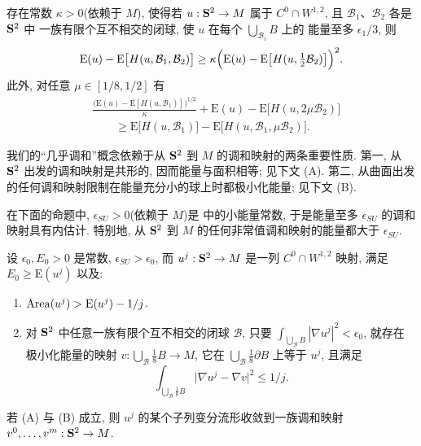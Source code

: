 \begin{lemma}
\label{lem:5.11}
存在常数 $\kappa>0$(依赖于 $M$), 使得若 $u:\mathbf{S}^2\to M$ 属于
$C^0\cap W^{1,2}$, 且 $\mathcal{B}_1$、$\mathcal{B}_2$ 各是 $\mathbf{S}^2$ 中
一族有限个互不相交的闭球, 使 $u$ 在每个 $\bigcup_{\mathcal{B}_i}B$ 上的
能量至多 $\epsilon_1/3$, 则
\begin{equation}
\mathrm{E}(u)-\mathrm{E}\bigl[H(u,\mathcal{B}_1,\mathcal{B}_2)\bigr]
\geq\kappa\Bigl(\mathrm{E}(u)-\mathrm{E}\bigl[H(u,\tfrac12\mathcal{B}_2)\bigr]
\Bigr)^2.
\label{eq:5.37}
\end{equation}
此外, 对任意 $\mu\in[1/8,1/2]$ 有
\begin{equation}
\begin{aligned}
&\frac{\bigl(\mathrm{E}(u)-\mathrm{E}[H(u,\mathcal{B}_1)]\bigr)^{1/2}}{\kappa}
+\mathrm{E}(u)-\mathrm{E}\bigl[H(u,2\mu\mathcal{B}_2)\bigr]\\
&\qquad\geq\mathrm{E}\bigl[H(u,\mathcal{B}_1)\bigr]
-\mathrm{E}\bigl[H(u,\mathcal{B}_1,\mu\mathcal{B}_2)\bigr].
\end{aligned}
\label{eq:5.38}
\end{equation}
\end{lemma}

我们的``几乎调和''概念依赖于从 $\mathbf{S}^2$ 到 $M$ 的调和映射的两条重要性质.
第一, 从 $\mathbf{S}^2$ 出发的调和映射是共形的, 因而能量与面积相等; 见下文 (A).
第二, 从曲面出发的任何调和映射限制在能量充分小的球上时都极小化能量;
见下文 (B).

在下面的命题中, $\epsilon_{SU}>0$(依赖于 $M$)是 中的小能量常数,
于是能量至多 $\epsilon_{SU}$ 的调和映射具有内估计. 特别地, 从 $\mathbf{S}^2$ 到
$M$ 的任何非常值调和映射的能量都大于 $\epsilon_{SU}$.

\begin{proposition}
\label{prop:5.12}
设 $\epsilon_0,E_0>0$ 是常数, $\epsilon_{SU}>\epsilon_0$, 而
$u^j:\mathbf{S}^2\to M$ 是一列 $C^0\cap W^{1,2}$ 映射, 满足
$E_0\geq\mathrm{E}(u^j)$ 以及:

\begin{enumerate}[label=(\Alph*),leftmargin=2.2em]
\item $\operatorname{Area}(u^j)>\mathrm{E}(u^j)-1/j$.
\item 对 $\mathbf{S}^2$ 中任意一族有限个互不相交的闭球 $\mathcal{B}$, 只要
      $\int_{\bigcup_{\mathcal{B}}B}|\nabla u^j|^2<\epsilon_0$, 就存在
      极小化能量的映射 $v:\bigcup_{\mathcal{B}}\frac18B\to M$, 它在
      $\bigcup_{\mathcal{B}}\frac18\partial B$ 上等于 $u^j$, 且满足
\begin{equation*}
\int_{\bigcup_{\mathcal{B}}\frac18B}\bigl|\nabla u^j-\nabla v\bigr|^2
\leq 1/j.
\end{equation*}
\end{enumerate}

若 (A) 与 (B) 成立, 则 $u^j$ 的某个子列变分流形收敛到一族调和映射
$v^0,\dots,v^m:\mathbf{S}^2\to M$.
\end{proposition}


